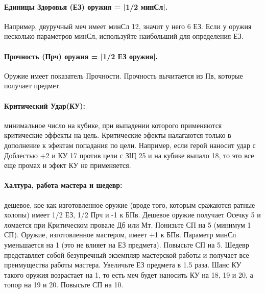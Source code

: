 \paragraph{Единицы Здоровья (ЕЗ) оружия = |1/2 минСл|.} Например, двуручный меч имеет минСл 12, значит у него 6 ЕЗ. Если у оружия несколько параметров минСл, используйте наибольший для определения ЕЗ.
\paragraph{Прочность (Прч) оружия = |1/2 ЕЗ оружия|.} Оружие имеет показатель Прочности. Прочность вычитается из Пв, которые получает предмет.
\paragraph{Критический Удар(КУ):} минимальное число на кубике, при выпадении которого применяются критические эффекты на цель. Критические эфекты налагаются только в дополнение к эфектам попадания по цели. Например, если герой наносит удар с Доблестью +2 и КУ 17 против цели с ЗЩ 25 и на кубике выпало 18, то это все еще промах и эфект КУ не применяется.
\paragraph{Халтура, работа мастера и шедевр:} дешевое, кое-как изготовленное оружие (вроде того, которым сражаются ратные холопы) имеет 1/2 ЕЗ, 1/2 Прч и -1 к БПв. Дешевое оружие получает Осечку 5 и ломается при Критическом провале Дб или Мт. Понизьте СП на 5 (минимум 1 СП).
\newline Оружие, изготовленное мастером, имеет +1 к БПв. Параметр минСл уменьшается на 1 (это не влияет на ЕЗ предмета). Повысьте СП на 5.
\newline
Шедевр представляет собой безупречный экземпляр мастерской работы и получает все преимущества работы мастера. Увеличьте ЕЗ предмета в 1.5 раза. Шанс КУ такого оружия возрастает на 1, то есть меч будет наносить КУ на 18, 19 и 20, а топор на 19 и 20. Повысьте СП на 10.
